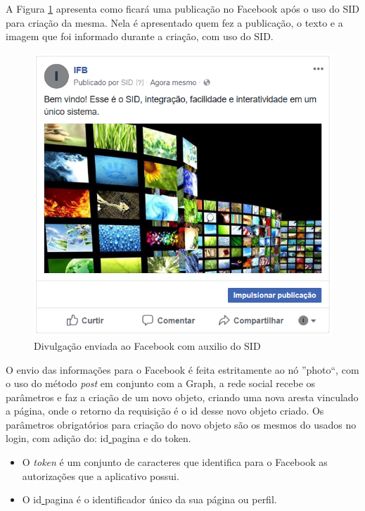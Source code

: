 A Figura \ref{fig:imgfacebook1} apresenta como ficará uma publicação no Facebook após o uso do SID para criação da mesma. Nela é apresentado quem fez a publicação, o texto e a imagem que foi informado durante a criação, com uso do SID.

\begin{figure}[H]
\centering
\includegraphics[scale=1]{figuras/imgfacebook1}
\caption{Divulgação enviada ao Facebook com auxilio do SID}
\label{fig:imgfacebook1}
\end{figure}

O envio das informações para o Facebook é feita estritamente ao nó ''photo``, com o uso do método \textit{post} em conjunto com a Graph, a rede social recebe os parâmetros e faz a criação de um novo objeto, criando uma nova aresta vinculado a página, onde o retorno da requisição é o id desse novo objeto criado. Os parâmetros obrigatórios para criação do novo objeto são os mesmos do usados no login, com adição do: id\underline{{ }}pagina e do token. 

\begin{itemize}
\item O \textit{token} é um conjunto de caracteres que identifica para o Facebook as autorizações que a aplicativo possui.

\item O id\underline{{ }}pagina é o identificador único da sua página ou perfil.
\end{itemize}

